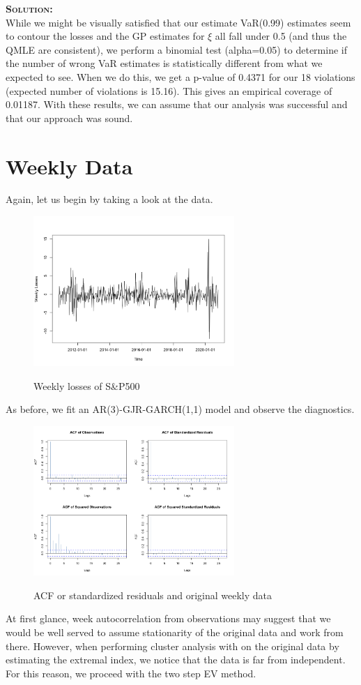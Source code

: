 \documentclass[12pt,oneside]{article}
\newenvironment{solution}
    {\textbf{\textsc{Solution:}}\\}
    {\newpage}
\begin{document}
\begin{solution}
While we might be visually satisfied that our estimate VaR(0.99) estimates seem to contour the losses and the GP estimates for $\xi$ all fall under 0.5 (and thus the QMLE are consistent), we perform a binomial test (alpha=0.05) to determine if the number of wrong VaR estimates is statistically different from what we expected to see. When we do this, we get a p-value of 0.4371 for our 18 violations (expected number of violations is 15.16). This gives an empirical coverage of 0.01187. With these results, we can assume that our analysis was successful and that our approach was sound.

\section*{Weekly Data}
Again, let us begin by taking a look at the data.
\begin{figure}[H]
\begin{center}
{\includegraphics[width=3in]{Assignments/a4/week-data.png}}
\caption{Weekly losses of S\&P500 }
\end{center}
\end{figure}
As before, we fit an AR(3)-GJR-GARCH(1,1) model and observe the diagnostics. 
\begin{figure}[H]
\begin{center}
{\includegraphics[width=3in]{Assignments/a4/week-acfs.png}}
\caption{ACF or standardized residuals and original weekly data }
\end{center}
\end{figure}
At first glance, week autocorrelation from observations may suggest that we would be well served to assume stationarity of the original data and work from there. However, when performing cluster analysis with on the original data by estimating the extremal index, we notice that the data is far from independent. For this reason, we proceed with the two step EV method.


\end{solution}
\end{document}
